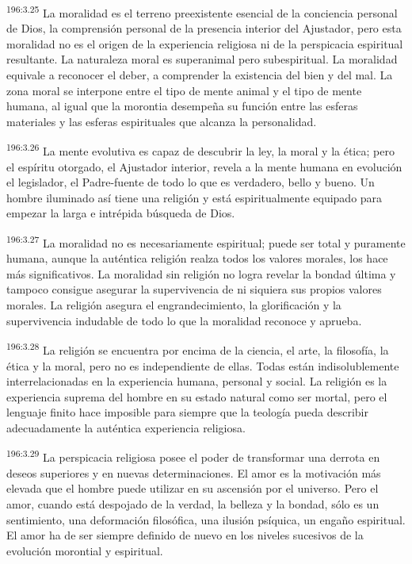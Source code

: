 \par 
\textsuperscript{196:3.25} La moralidad es el terreno preexistente esencial de la conciencia personal de Dios, la comprensión personal de la presencia interior del Ajustador, pero esta moralidad no es el origen de la experiencia religiosa ni de la perspicacia espiritual resultante. La naturaleza moral es superanimal pero subespiritual. La moralidad equivale a reconocer el deber, a comprender la existencia del bien y del mal. La zona moral se interpone entre el tipo de mente animal y el tipo de mente humana, al igual que la morontia desempeña su función entre las esferas materiales y las esferas espirituales que alcanza la personalidad.

\par 
\textsuperscript{196:3.26} La mente evolutiva es capaz de descubrir la ley, la moral y la ética; pero el espíritu otorgado, el Ajustador interior, revela a la mente humana en evolución el legislador, el Padre-fuente de todo lo que es verdadero, bello y bueno. Un hombre iluminado así tiene una religión y está espiritualmente equipado para empezar la larga e intrépida búsqueda de Dios.

\par 
\textsuperscript{196:3.27} La moralidad no es necesariamente espiritual; puede ser total y puramente humana, aunque la auténtica religión realza todos los valores morales, los hace más significativos. La moralidad sin religión no logra revelar la bondad última y tampoco consigue asegurar la supervivencia de ni siquiera sus propios valores morales. La religión asegura el engrandecimiento, la glorificación y la supervivencia indudable de todo lo que la moralidad reconoce y aprueba.

\par 
\textsuperscript{196:3.28} La religión se encuentra por encima de la ciencia, el arte, la filosofía, la ética y la moral, pero no es independiente de ellas. Todas están indisolublemente interrelacionadas en la experiencia humana, personal y social. La religión es la experiencia suprema del hombre en su estado natural como ser mortal, pero el lenguaje finito hace imposible para siempre que la teología pueda describir adecuadamente la auténtica experiencia religiosa.

\par 
\textsuperscript{196:3.29} La perspicacia religiosa posee el poder de transformar una derrota en deseos superiores y en nuevas determinaciones. El amor es la motivación más elevada que el hombre puede utilizar en su ascensión por el universo. Pero el amor, cuando está despojado de la verdad, la belleza y la bondad, sólo es un sentimiento, una deformación filosófica, una ilusión psíquica, un engaño espiritual. El amor ha de ser siempre definido de nuevo en los niveles sucesivos de la evolución morontial y espiritual.


